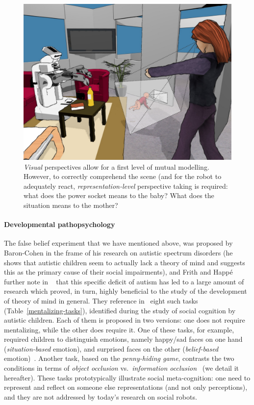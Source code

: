 \documentclass{sig-alternate}
\begin{document}
\begin{figure}
        \centering
        \includegraphics[width=0.9\columnwidth]{representation-perspective-taking}
        \caption{\small \emph{Visual} perspectives allow for a first level of
            mutual modelling. However, to correctly comprehend the scene (and
            for the robot to adequately react, \emph{representation-level}
            perspective taking is required: what does the power socket means to
            the baby? What does the situation means to the mother?}

        \label{representation-level}
\end{figure}

\paragraph{Developmental pathopsychology}

The false belief experiment that we have mentioned above, was proposed by
Baron-Cohen in the frame of his research on autistic spectrum disorders (he
shows that autistic children seem to actually lack a theory of mind and suggests
this as the primary cause of their social impairments), and Frith and Happé
further note in ~\cite{frith1994autism} that this specific deficit of autism has
led to a large amount of research which proved, in turn, highly beneficial to
the study of the development of theory of mind in general. They reference
in~\cite{frith1994autism} eight such tasks (Table~\ref{mentalizing-tasks}),
identified during the study of social cognition by autistic children. Each of
them is proposed in two versions: one does not require mentalizing, while the
other does require it.  One of these tasks, for example, required children to
distinguish emotions, namely happy/sad faces on one hand (\emph{situation-based}
emotion), and surprised faces on the other (\emph{belief-based}
emotion)~\cite{baron1993children}.  Another task, based on the
\emph{penny-hiding game}, contrasts the two conditions in terms of \emph{object
occlusion} vs.~\emph{information occlusion}~\cite{baron1992out} (we detail it
hereafter). These tasks prototypically illustrate social meta-cognition: one
need to represent and reflect on someone else representations (and not only
perceptions), and they are not addressed by today's research on social robots.
\end{document}
